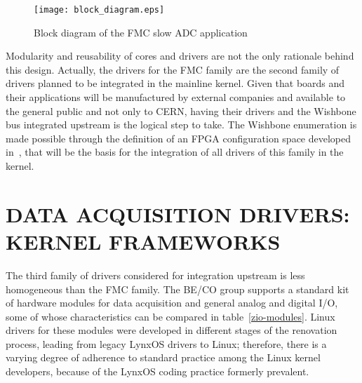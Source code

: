 \documentclass{JAC2003}
\begin{document}
\begin{figure}[t]
   \centering
   \texttt{[image: block\_diagram.eps]}
   \caption{Block diagram of the FMC slow ADC application}
   \label{slow-adc}
\end{figure}

Modularity and reusability of cores and drivers are not the only rationale
behind this design. Actually, the drivers for the FMC family are the second
family of drivers planned to be integrated in the mainline kernel. Given
that boards and their applications will be manufactured by external
companies and available to the general public and not only to CERN,
having their drivers and the Wishbone
bus integrated upstream is the logical step to take. The Wishbone enumeration is made
possible through the definition of an FPGA configuration space developed
in~\cite{fpga-config-space}, that will be the basis for the integration of
all drivers of this family in the kernel.

\section{DATA ACQUISITION DRIVERS: KERNEL FRAMEWORKS}

The third family of drivers considered for integration upstream is less
homogeneous than the FMC family. The BE/CO group supports a standard kit
of hardware modules for data acquisition and general analog and digital I/O,
some of whose characteristics can be compared in table~\ref{zio-modules}. Linux
drivers for these modules were developed in different stages of the renovation
process, leading from legacy LynxOS drivers to Linux; therefore, there is a
varying degree of adherence to standard practice among the Linux kernel
developers,
because of the LynxOS coding practice formerly prevalent.
\end{document}

